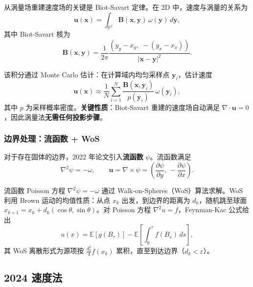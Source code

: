 \documentclass[12pt,a4paper]{article}
\begin{document}
从涡量场重建速度场的关键是 Biot-Savart 定律。在 2D 中，速度与涡量的关系为
\begin{equation}
\boldsymbol{u}(\boldsymbol{x}) = \int_{\mathbb{R}^2} \boldsymbol{B}(\boldsymbol{x},\boldsymbol{y})\,\omega(\boldsymbol{y})\,d\boldsymbol{y},
\label{eq:biot_savart}
\end{equation}
其中 Biot-Savart 核为
\begin{equation}
\boldsymbol{B}(\boldsymbol{x},\boldsymbol{y}) = \frac{1}{2\pi}\frac{(y_y - x_y,\; -(y_x - x_x))}{|\boldsymbol{x}-\boldsymbol{y}|^2}.
\end{equation}

该积分通过 Monte Carlo 估计：在计算域内均匀采样点 $\boldsymbol{y}_i$，估计速度
\begin{equation}
\boldsymbol{u}(\boldsymbol{x}) \approx \frac{1}{N}\sum_{i=1}^N \frac{\boldsymbol{B}(\boldsymbol{x},\boldsymbol{y}_i)}{p(\boldsymbol{y}_i)}\,\omega(\boldsymbol{y}_i),
\end{equation}
其中 $p$ 为采样概率密度。\textbf{关键性质}：Biot-Savart 重建的速度场自动满足 $\nabla\cdot\boldsymbol{u}=0$，因此涡量法\textbf{无需任何投影步骤}。

\subsubsection{边界处理：流函数 + WoS}

对于存在固体的边界，2022 年论文引入\textbf{流函数} $\psi$。流函数满足
\begin{equation}
\nabla^2 \psi = -\omega, \qquad \boldsymbol{u} = \nabla\times\psi = \left(\frac{\partial\psi}{\partial y},\,-\frac{\partial\psi}{\partial x}\right).
\end{equation}

流函数 Poisson 方程 $\nabla^2\psi = -\omega$ 通过 Walk-on-Spheres（WoS）算法求解。WoS 利用 Brown 运动的均值性质：从点 $x_k$ 出发，到边界的距离为 $d_k$，随机跳至球面 $x_{k+1} = x_k + d_k(\cos\theta,\sin\theta)$。对 Poisson 方程 $\nabla^2 u = f$，Feynman-Kac 公式给出
\begin{equation}
u(x) = \mathbb{E}[g(B_\tau)] - \mathbb{E}\left[\int_0^\tau f(B_s)\,ds\right],
\end{equation}
其 WoS 离散形式为源项按 $\frac{d_k^2}{4}f(x_k)$ 累积，直至到达边界（$d_k < \varepsilon$）。

\subsection{2024 速度法}
\end{document}
